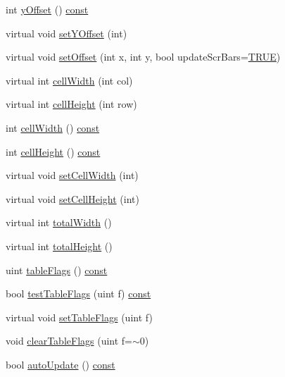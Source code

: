 \begin{DoxyCompactItemize}
int \hyperlink{classQtTableView_a2d6bce1316874011a6194073825c07b5}{y\+Offset} () \hyperlink{tradstdc_8h_a2c212835823e3c54a8ab6d95c652660e}{const} 
\item 
virtual void \hyperlink{classQtTableView_ad34ae0aec22c98fa3f1c446f5579d9af}{set\+Y\+Offset} (int)
\item 
virtual void \hyperlink{classQtTableView_a0ebbc43ed33366e715888bcc6434f0c1}{set\+Offset} (int x, int y, bool update\+Scr\+Bars=\hyperlink{xpm2img_8c_aa8cecfc5c5c054d2875c03e77b7be15d}{T\+R\+U\+E})
\item 
virtual int \hyperlink{classQtTableView_a3e8c856284cdcc4d28844c1ee2ef0e78}{cell\+Width} (int col)
\item 
virtual int \hyperlink{classQtTableView_adb85b7c8d3d4cfb2d911a637a042035f}{cell\+Height} (int row)
\item 
int \hyperlink{classQtTableView_aee8b9870ad3f3775c0dafb123c918100}{cell\+Width} () \hyperlink{tradstdc_8h_a2c212835823e3c54a8ab6d95c652660e}{const} 
\item 
int \hyperlink{classQtTableView_aa5bb9bbaeb4bd0b29412dae858b423d5}{cell\+Height} () \hyperlink{tradstdc_8h_a2c212835823e3c54a8ab6d95c652660e}{const} 
\item 
virtual void \hyperlink{classQtTableView_a45b66d2a0b6433693602d83611508368}{set\+Cell\+Width} (int)
\item 
virtual void \hyperlink{classQtTableView_a99ccdcfb802520cfb1fe7b19d3112b6a}{set\+Cell\+Height} (int)
\item 
virtual int \hyperlink{classQtTableView_a9e76f17e3d2aeada0eba0d5279a8892d}{total\+Width} ()
\item 
virtual int \hyperlink{classQtTableView_ad7d88ca8855d5b66637047afb5fd2a2c}{total\+Height} ()
\item 
uint \hyperlink{classQtTableView_a69f5040c33fe576fea1f4ad8bf18e69a}{table\+Flags} () \hyperlink{tradstdc_8h_a2c212835823e3c54a8ab6d95c652660e}{const} 
\item 
bool \hyperlink{classQtTableView_a29a407a54d711b0539db1f29bfbe11e0}{test\+Table\+Flags} (uint f) \hyperlink{tradstdc_8h_a2c212835823e3c54a8ab6d95c652660e}{const} 
\item 
virtual void \hyperlink{classQtTableView_ade42e40c63c2c640ff44de2daa520597}{set\+Table\+Flags} (uint f)
\item 
void \hyperlink{classQtTableView_ab408be87ad4be8cbc496a5c76c911b70}{clear\+Table\+Flags} (uint f=$\sim$0)
\item 
bool \hyperlink{classQtTableView_a2cbbc9b91f5c37e6ac0bba6aa1429c0a}{auto\+Update} () \hyperlink{tradstdc_8h_a2c212835823e3c54a8ab6d95c652660e}{const} 

\end{DoxyCompactItemize}
